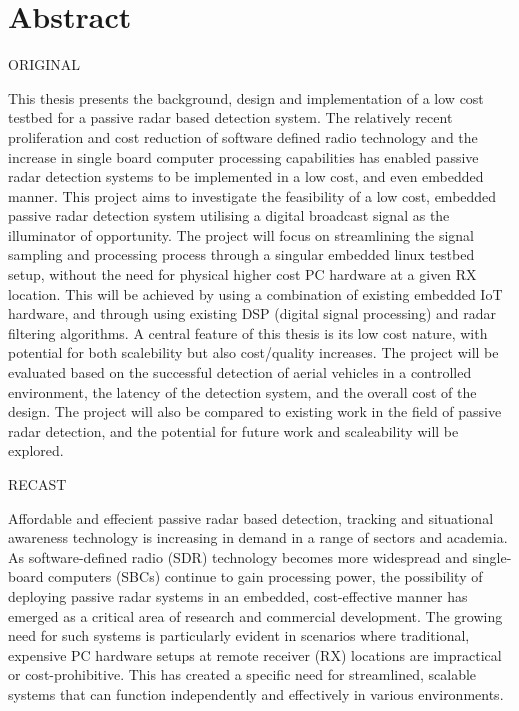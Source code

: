 \chapter*{Abstract \label{sec:abstract}}

ORIGINAL
\vspace{0.1cm} \par
This thesis presents the background, design and implementation of a low cost testbed for a passive radar based detection system. The relatively recent proliferation and cost reduction of software defined radio technology and the increase in single board computer processing capabilities has enabled passive radar detection systems to be implemented in a low cost, and even embedded manner. This project aims to investigate the feasibility of a low cost, embedded passive radar detection system utilising a digital broadcast signal as the illuminator of opportunity. The project will focus on streamlining the signal sampling and processing process through a singular embedded linux testbed setup, without the need for physical higher cost PC hardware at a given RX location. This will be achieved by using a combination of existing embedded IoT hardware, and through using existing DSP (digital signal processing) and radar filtering algorithms. A central feature of this thesis is its low cost nature, with potential for both scalebility but also cost/quality increases. The project will be evaluated based on the successful detection of aerial vehicles in a controlled environment, the latency of the detection system, and the overall cost of the design. The project will also be compared to existing work in the field of passive radar detection, and the potential for future work and scaleability will be explored.

\vspace{0.22cm}
RECAST
\vspace{0.2cm} \par
Affordable and effecient passive radar based detection, tracking and situational awareness technology is increasing in demand in a range of sectors and academia. As software-defined radio (SDR) technology becomes more widespread and single-board computers (SBCs) continue to gain processing power, the possibility of deploying passive radar systems in an embedded, cost-effective manner has emerged as a critical area of research and commercial development. The growing need for such systems is particularly evident in scenarios where traditional, expensive PC hardware setups at remote receiver (RX) locations are impractical or cost-prohibitive. This has created a specific need for streamlined, scalable systems that can function independently and effectively in various environments.

